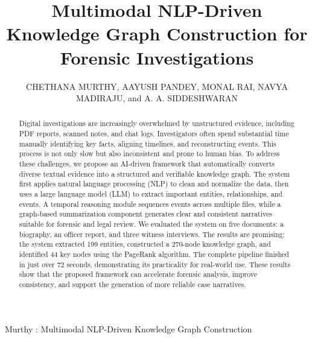 \documentclass{ieeeaccess}
\begin{document}
\title{Multimodal NLP-Driven Knowledge Graph Construction for Forensic Investigations}

\author{\uppercase{Chethana Murthy},
\uppercase{Aayush Pandey},
\uppercase{Monal Rai},
\uppercase{Navya Madiraju}, and
\uppercase{A. A. Siddeshwaran}}

\address[1]{Assistant Professor, RV College of Engineering, Bengaluru, India (e-mail: chethanamurthy@rvce.edu.in)}
\address[2]{Department of Computer Science Engineering, RV College of Engineering, Bengaluru, India \\ (e-mail: aayushpandey.is23@rvce.edu.in; monalrai.cs23@rvce.edu.in; navyamadiraju.cs23@rvce.edu.in; aasiddeshwaran.is23@rvce.edu.in)}

{Murthy \headeretal: Multimodal NLP-Driven Knowledge Graph Construction}

\history{}
\doi{}

\begin{abstract}
Digital investigations are increasingly overwhelmed by unstructured evidence, including PDF reports, scanned notes, and chat logs. Investigators often spend substantial time manually identifying key facts, aligning timelines, and reconstructing events. This process is not only slow but also inconsistent and prone to human bias. To address these challenges, we propose an AI-driven framework that automatically converts diverse textual evidence into a structured and verifiable knowledge graph. The system first applies natural language processing (NLP) to clean and normalize the data, then uses a large language model (LLM) to extract important entities, relationships, and events. A temporal reasoning module sequences events across multiple files, while a graph-based summarization component generates clear and consistent narratives suitable for forensic and legal review. We evaluated the system on five documents: a biography, an officer report, and three witness interviews. The results are promising: the system extracted 199 entities, constructed a 270-node knowledge graph, and identified 44 key nodes using the PageRank algorithm. The complete pipeline finished in just over 72 seconds, demonstrating its practicality for real-world use. These results show that the proposed framework can accelerate forensic analysis, improve consistency, and support the generation of more reliable case narratives.
\end{abstract}
\end{document}

